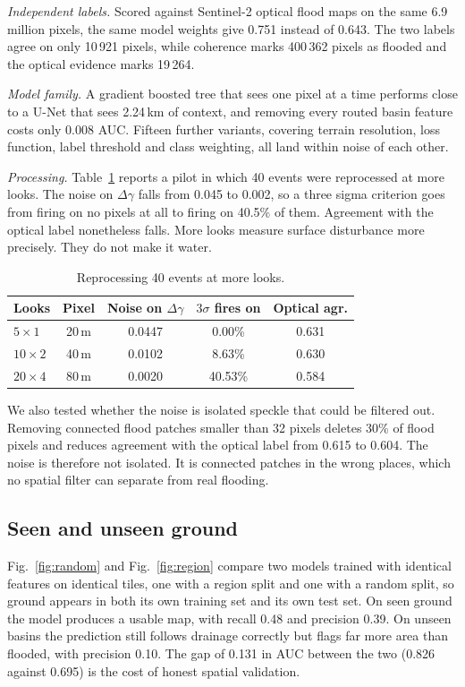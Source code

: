 \documentclass[10pt,conference]{IEEEtran}
\begin{document}
\emph{Independent labels.} Scored against Sentinel-2 optical flood maps on the
same 6.9 million pixels, the same model weights give 0.751 instead of 0.643.
The two labels agree on only 10\,921 pixels, while coherence marks 400\,362
pixels as flooded and the optical evidence marks 19\,264.

\emph{Model family.} A gradient boosted tree that sees one pixel at a time
performs close to a U-Net that sees 2.24\,km of context, and removing every
routed basin feature costs only 0.008 AUC. Fifteen further variants, covering
terrain resolution, loss function, label threshold and class weighting, all land
within noise of each other.

\emph{Processing.} Table~\ref{tab:looks} reports a pilot in which 40 events were
reprocessed at more looks. The noise on $\Delta\gamma$ falls from 0.045 to
0.002, so a three sigma criterion goes from firing on no pixels at all to firing
on 40.5\% of them. Agreement with the optical label nonetheless falls. More
looks measure surface disturbance more precisely. They do not make it water.

\begin{table}[t]
\caption{Reprocessing 40 events at more looks.}
\label{tab:looks}
\centering
\begin{tabular}{lcccc}
\toprule
Looks & Pixel & Noise on $\Delta\gamma$ & $3\sigma$ fires on & Optical agr. \\
\midrule
$5\times1$  & 20\,m & 0.0447 & 0.00\%  & 0.631 \\
$10\times2$ & 40\,m & 0.0102 & 8.63\%  & 0.630 \\
$20\times4$ & 80\,m & 0.0020 & 40.53\% & 0.584 \\
\bottomrule
\end{tabular}
\end{table}

We also tested whether the noise is isolated speckle that could be filtered out.
Removing connected flood patches smaller than 32 pixels deletes 30\% of flood
pixels and reduces agreement with the optical label from 0.615 to 0.604. The
noise is therefore not isolated. It is connected patches in the wrong places,
which no spatial filter can separate from real flooding.

\subsection{Seen and unseen ground}
Fig.~\ref{fig:random} and Fig.~\ref{fig:region} compare two models trained with
identical features on identical tiles, one with a region split and one with a
random split, so ground appears in both its own training set and its own test
set. On seen ground the model produces a usable map, with recall 0.48 and
precision 0.39. On unseen basins the prediction still follows drainage correctly
but flags far more area than flooded, with precision 0.10. The gap of 0.131 in
AUC between the two (0.826 against 0.695) is the cost of honest spatial
validation.
\end{document}
